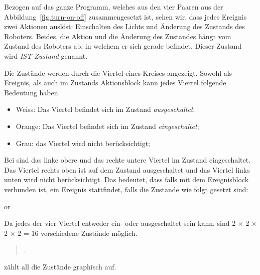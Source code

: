 Bezogen auf das ganze Programm, welches aus den vier Paaren aus der Abbildung~\ref{fig.turn-on-off}  zusammengesetzt ist, sehen wir, dass jedes Ereignis zwei Aktionen auslöst: Einschalten des Lichts und Änderung des Zustands des Roboters. Beides, die Aktion und die Änderung des Zustandes hängt vom Zustand des Roboters ab, in welchem er sich gerade befindet. Dieser Zustand wird \emph{IST-Zustand} genannt.

\newpage
{}

Die Zustände werden durch die Viertel eines Kreises angezeigt. Sowohl als Ereignis, als auch im Zustands Aktionsblock kann jedes Viertel folgende Bedeutung haben. 
\begin{itemize}

\item Weiss: Das Viertel befindet sich im Zustand \emph{ausgeschaltet};
\item Orange: Das Viertel befindet sich im Zustand \emph{eingeschaltet};
\item Grau: das Viertel wird nicht berücksichtigt;

\end{itemize}

Bei  sind das linke obere und das rechte untere Viertel im Zustand eingeschaltet. Das Viertel rechts oben ist auf dem Zustand ausgeschaltet und das Viertel links unten wird nicht berücksichtigt. Das bedeutet, dass falls  mit dem Ereignisblock verbunden ist, ein Ereignis stattfindet, falls die Zustände wie folgt gesetzt sind:

\begin{center}
\centering {}\quad or \quad {}
\end{center}

Da jedes der vier Viertel entweder ein- oder ausgeschaltet sein kann, sind 2 $\times$ 2 $\times$ 2 $\times$ 2 = 16 verschiedene Zustände möglich.

\begin{quote}
.
\end{quote}
 zählt all die Zustände graphisch auf. 

